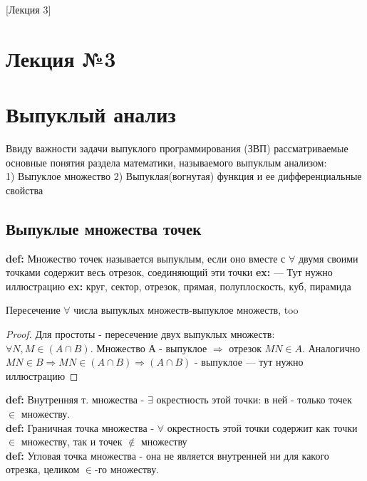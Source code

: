 [Лекция 3]

\newpage

\section{Лекция №3}
\section*{Выпуклый анализ}
Ввиду важности задачи выпуклого программирования (ЗВП) рассматриваемые основные понятия раздела математики, называемого выпуклым анализом: \\ 1) Выпуклое множество 2) Выпуклая(вогнутая) функция и ее дифференциальные свойства

\subsection*{Выпуклые множества точек}
\textbf{def:}
Множество точек называется выпуклым, если оно вместе с $\forall$ двумя своими точками содержит весь отрезок, соединяющий эти точки
\textbf{ex:} --- Тут нужно иллюстрацию
\textbf{ex:} круг, сектор, отрезок, прямая, полуплоскость, куб, пирамида

\begin{theorem}
Пересечение $\forall$ числа выпуклых множеств-выпуклое множеств, too
\end{theorem}

\renewcommand\qedsymbol{$\blacksquare$}

\begin{proof}
Для простоты - пересечение двух выпуклых множеств: \\ $\forall N,M \in (A \cap B)$. Множество А - выпуклое $\Rightarrow$ отрезок $MN \in A$. Аналогично \\ $MN \in B $$\Rightarrow$$ MN \in (A \cap B) $$\Rightarrow$$ (A \cap B)$ - выпуклое --- тут нужно иллюстрацию
\end{proof}

\textbf{def:} Внутренняя т. множества - $\exists$ окрестность этой точки: в ней - только точек $\in$ множеству. \\

\textbf{def:} Граничная точка множества - $\forall$ окрестность этой точки содержит как точки $\in$ множеству, так и точек $\notin$ множеству \\

\textbf{def:} Угловая точка множества - она не является внутренней ни для какого отрезка, целиком $\in$-го множеству. \\

